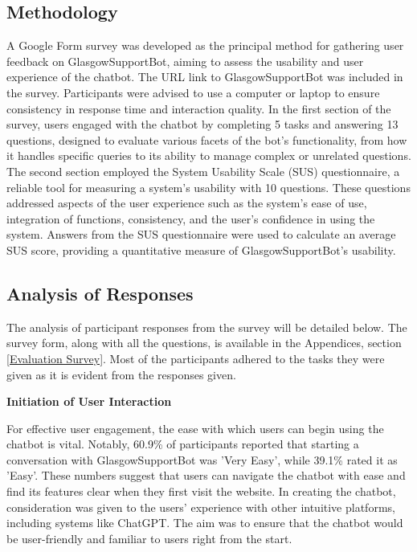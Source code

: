 \documentclass{l4proj}
\begin{document}
\subsection{Methodology}

A Google Form survey was developed as the principal method for gathering user feedback on GlasgowSupportBot, aiming to assess the usability and user experience of the chatbot. The URL link to GlasgowSupportBot was included in the survey. Participants were advised to use a computer or laptop to ensure consistency in response time and interaction quality. In the first section of the survey, users engaged with the chatbot by completing 5 tasks and answering 13 questions, designed to evaluate various facets of the bot's functionality, from how it handles specific queries to its ability to manage complex or unrelated questions. The second section employed the System Usability Scale (SUS) questionnaire, a reliable tool for measuring a system's usability with 10 questions. These questions addressed aspects of the user experience such as the system's ease of use, integration of functions, consistency, and the user's confidence in using the system. Answers from the SUS questionnaire were used to calculate an average SUS score, providing a quantitative measure of GlasgowSupportBot's usability.

\subsection{Analysis of Responses}
The analysis of participant responses from the survey will be detailed below.
The survey form, along with all the questions, is available in the Appendices, section \ref{Evaluation Survey}. Most of the participants adhered to the tasks they were given as it is evident from the responses given.

\textbf{Initiation of User Interaction}

For effective user engagement, the ease with which users can begin using the chatbot is vital. Notably, 60.9\% of participants reported that starting a conversation with GlasgowSupportBot was 'Very Easy', while 39.1\% rated it as 'Easy'. These numbers suggest that users can navigate the chatbot with ease and find its features clear when they first visit the website. In creating the chatbot, consideration was given to the users' experience with other intuitive platforms, including systems like ChatGPT. The aim was to ensure that the chatbot would be user-friendly and familiar to users right from the start.
\end{document}
